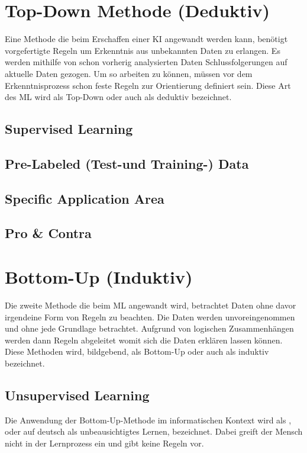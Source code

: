 \documentclass[12pt,german,ngerman]{report}
\begin{document}
    \section{Top-Down Methode (Deduktiv)}
        Eine Methode die beim Erschaffen einer KI angewandt werden kann, benötigt vorgefertigte
        Regeln um Erkenntnis aus unbekannten Daten zu erlangen. Es werden mithilfe von schon vorherig
        analysierten Daten Schlussfolgerungen auf aktuelle Daten gezogen. 
        Um so arbeiten zu können, müssen vor dem Erkenntnisprozess schon feste Regeln zur Orientierung definiert sein.
        Diese Art des ML wird als Top-Down oder auch als deduktiv\cite{dundi2021unileipzig} bezeichnet.
        \subsection{Supervised Learning}
        \subsection{Pre-Labeled (Test-und Training-) Data}
        \subsection{Specific Application Area}
        \subsection{Pro \& Contra}
        
    \section{Bottom-Up (Induktiv)}
        Die zweite Methode die beim ML angewandt wird, betrachtet Daten ohne davor irgendeine Form von Regeln zu beachten.  
        Die Daten werden unvoreingenommen und ohne jede Grundlage betrachtet.
        Aufgrund von logischen Zusammenhängen werden dann Regeln abgeleitet womit sich die Daten erklären lassen können.
        Diese Methoden wird, bildgebend, als Bottom-Up oder auch als induktiv\cite{dundi2021unileipzig} bezeichnet.
        \subsection{Unsupervised Learning}
        Die Anwendung der Bottom-Up-Methode im informatischen Kontext wird als , oder auf deutsch als unbeausichtigtes Lernen, bezeichnet.
        Dabei greift der Mensch nicht in der Lernprozess ein und gibt keine Regeln vor.
\end{document}
